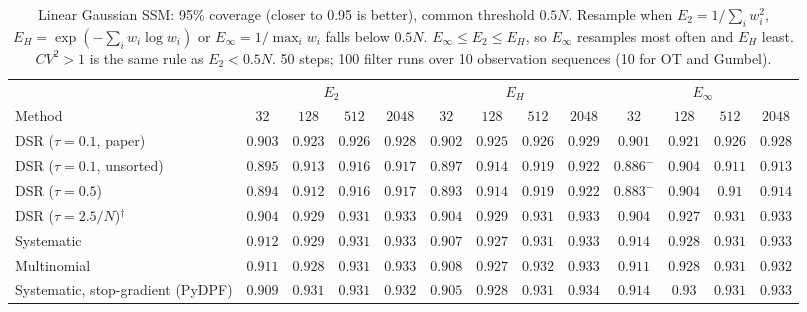 \begin{table}[ht]
\centering
\small
\caption{Linear Gaussian SSM: 95\% coverage (closer to 0.95 is better), common threshold $0.5N$. Resample when $E_2=1/\sum_iw_i^2$, $E_H=\exp(-\sum_iw_i\log w_i)$ or $E_\infty=1/\max_iw_i$ falls below $0.5N$. $E_\infty\le E_2\le E_H$, so $E_\infty$ resamples most often and $E_H$ least. $CV^2>1$ is the same rule as $E_2<0.5N$. 50 steps; 100 filter runs over 10 observation sequences (10 for OT and Gumbel).}
\label{tab:trigger-fixed-linear-coverage95}
\begin{adjustbox}{max width=\linewidth}
\begin{tabular}{lcccc|cccc|cccc}
\toprule
 & \multicolumn{4}{c}{$E_2$} & \multicolumn{4}{c}{$E_H$} & \multicolumn{4}{c}{$E_\infty$} \\
\cmidrule(lr){2-5} \cmidrule(lr){6-9} \cmidrule(lr){10-13}
Method & $32$ & $128$ & $512$ & $2048$ & $32$ & $128$ & $512$ & $2048$ & $32$ & $128$ & $512$ & $2048$ \\
\midrule
DSR ($\tau{=}0.1$, paper) & $\mathbf{0.903}$ & $0.923$ & $0.926$ & $0.928$ & $0.902$ & $\mathbf{0.925}$ & $\mathbf{0.926}$ & $\mathbf{0.929}$ & $0.901$ & $0.921$ & $0.926$ & $0.928$ \\
DSR ($\tau{=}0.1$, unsorted) & $0.895$ & $0.913$ & $0.916$ & $0.917$ & $\mathbf{0.897}$ & $\mathbf{0.914}$ & $\mathbf{0.919}$ & $\mathbf{0.922}$ & $0.886^{-}$ & $0.904$ & $0.911$ & $0.913$ \\
DSR ($\tau{=}0.5$) & $\mathbf{0.894}$ & $0.912$ & $0.916$ & $0.917$ & $0.893$ & $\mathbf{0.914}$ & $\mathbf{0.919}$ & $\mathbf{0.922}$ & $0.883^{-}$ & $0.904$ & $0.91$ & $0.914$ \\
DSR ($\tau{=}2.5/N$)$^\dagger$ & $\mathbf{0.904}$ & $0.929$ & $0.931$ & $\mathbf{0.933}$ & $0.904$ & $\mathbf{0.929}$ & $0.931$ & $\mathbf{0.933}$ & $\mathbf{0.904}$ & $0.927$ & $\mathbf{0.931}$ & $0.933$ \\
\midrule
Systematic & $0.912$ & $\mathbf{0.929}$ & $\mathbf{0.931}$ & $\mathbf{0.933}$ & $0.907$ & $0.927$ & $0.931$ & $0.933$ & $\mathbf{0.914}$ & $0.928$ & $0.931$ & $0.933$ \\
Multinomial & $\mathbf{0.911}$ & $0.928$ & $0.931$ & $0.933$ & $0.908$ & $0.927$ & $\mathbf{0.932}$ & $\mathbf{0.933}$ & $0.911$ & $\mathbf{0.928}$ & $0.931$ & $0.932$ \\
Systematic, stop-gradient (PyDPF) & $0.909$ & $\mathbf{0.931}$ & $0.931$ & $0.932$ & $0.905$ & $0.928$ & $\mathbf{0.931}$ & $\mathbf{0.934}$ & $\mathbf{0.914}$ & $0.93$ & $\mathbf{0.931}$ & $0.933$ \\

\end{tabular}
\end{adjustbox}
\end{table}
